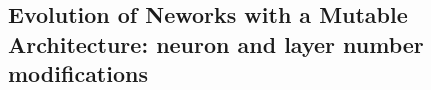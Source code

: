 \documentclass[runningheads]{llncs}
\begin{document}

\subsection{Evolution of Neworks with a Mutable Architecture: neuron and layer number modifications}



\end{document}
